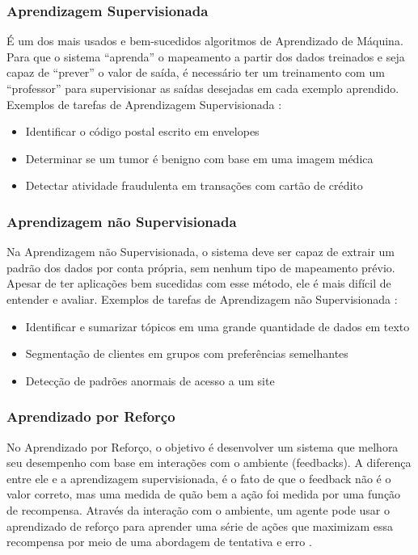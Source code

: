 \documentclass[
	12pt,				%
	openright,			%
	oneside,			%
	a4paper,			%
	english,			%
	spanish,			%
	brazil				%
	]{abntex2}
\begin{document}
	\subsubsection*{Aprendizagem Supervisionada}
		É um dos mais usados e bem-sucedidos algoritmos de Aprendizado de Máquina. Para que o sistema ``aprenda'' o mapeamento a partir dos dados treinados e seja capaz de ``prever''  o valor de saída, é necessário ter um treinamento com um ``professor'' para supervisionar as saídas desejadas em cada exemplo aprendido. Exemplos de tarefas de Aprendizagem Supervisionada \cite {guido_muller}: 
	\begin{itemize}
	 	\item Identificar o código postal escrito em envelopes
		\item Determinar se um tumor é benigno com base em uma imagem médica
		\item Detectar atividade fraudulenta em transações com cartão de crédito
	\end{itemize}

	\subsubsection*{Aprendizagem não Supervisionada}
		Na Aprendizagem não Supervisionada, o sistema deve ser capaz de extrair um padrão dos dados por conta própria, sem nenhum tipo de mapeamento prévio. Apesar de ter aplicações bem sucedidas com esse método, ele é mais difícil de entender e avaliar. Exemplos de tarefas de Aprendizagem não Supervisionada \cite {guido_muller}: 
	\begin{itemize}
	 	\item Identificar e sumarizar tópicos em uma grande quantidade de dados em texto
		\item Segmentação de clientes em grupos com preferências semelhantes
		\item Detecção de padrões anormais de acesso a um site
	\end{itemize}

	\subsubsection*{Aprendizado por Reforço}
		No Aprendizado por Reforço, o objetivo é desenvolver um sistema que melhora seu desempenho com base em interações com o ambiente (feedbacks). A diferença entre ele e a aprendizagem supervisionada, é o fato de que o feedback não é o valor correto, mas uma medida de quão bem a ação foi medida por uma função de recompensa. Através da interação com o ambiente, um agente pode usar o aprendizado de reforço para aprender uma série de ações que maximizam essa recompensa por meio de uma abordagem de tentativa e erro \cite{ r_julian_heart}.
\end{document}
